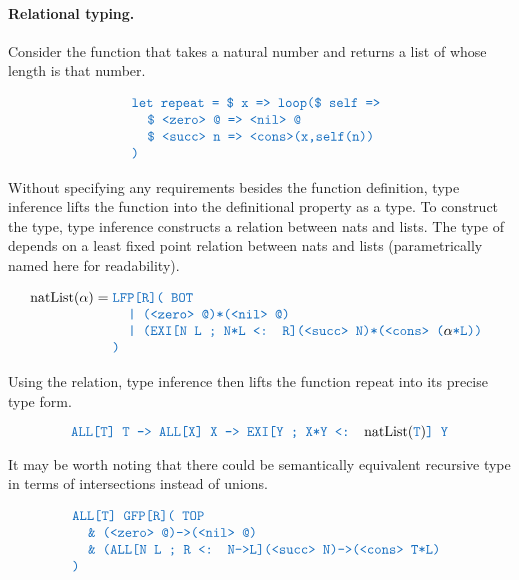 \documentclass[acmsmall]{acmart}
\theoremstyle{definition}
\begin{document}
\paragraph{Relational typing.} 
Consider the function  that takes a natural number and returns a list of whose length is that number. 

\[
  \begin{array}[t]{@{} l}
      \obj{let repeat = \$ x => loop(\$ self =>}
      \\
      \I \obj{\$ <zero> @ => <nil> @}
      \\
      \I \obj{\$ <succ> n => <cons>(x,self(n))}
      \\
      \obj{)}
  \end{array}
\]


Without specifying any requirements besides the function definition, type inference lifts 
the function into the definitional property as a type. 
To construct the type, type inference constructs a relation between nats and lists.
The type of  depends on a least fixed point relation between nats and lists 
(parametrically named here for readability).

\[
  \text{natList}(\alpha) = \begin{array}[t]{@{} l}
      \obj{LFP[R]( BOT} 
      \\
      \I \obj{| (<zero> @)*(<nil> @)}
      \\
      \I \obj{| (EXI[N L ; N*L <: R](<succ> N)*(<cons> (}\alpha\obj{*L))}
      \\
      \obj{)} 
  \end{array}
\]

Using the  relation, type inference then lifts the function repeat into its precise type form.

\[
  \obj{ALL[T] T -> ALL[X] X -> EXI[Y ; X*Y <: }\text{natList}(\obj{T}) \obj{] Y}
\]

It may be worth noting that there could be semantically equivalent recursive type in terms of intersections instead of unions. 


\[
  \begin{array}[t]{@{} l}
      \obj{ALL[T] GFP[R]( TOP} 
      \\
      \I \obj{\& (<zero> @)->(<nil> @)}
      \\
      \I \obj{\& (ALL[N L ; R <: N->L](<succ> N)->(<cons> T*L)}
      \\
      \obj{)} 
  \end{array}
\]
\end{document}
